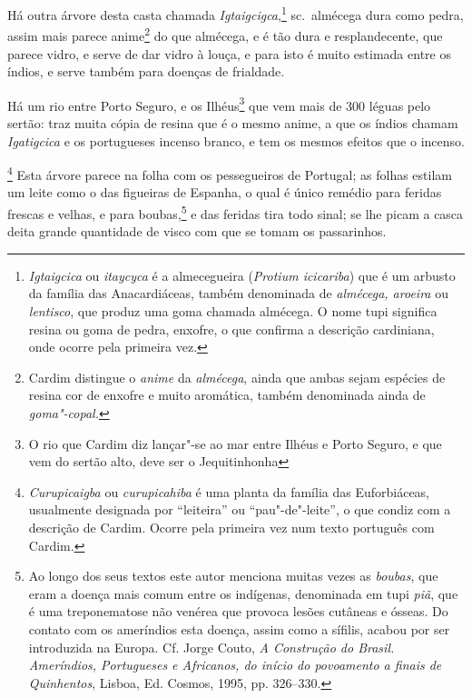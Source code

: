  Há outra árvore desta casta chamada \textit{Igtaigcigca},\footnote{ \textit{Igtaigcica} 
ou \textit{itaycyca} é a almecegueira
(\textit{Protium icicariba}) que é um arbusto da família das
Anacardiáceas, também denominada de \textit{almécega, aroeira} ou
\textit{lentisco}, que produz uma goma chamada almécega. O nome tupi
significa resina ou goma de pedra, enxofre, o que confirma a descrição
cardiniana, onde ocorre pela primeira vez.} sc.~almécega dura como
pedra, assim mais parece anime\footnote{ Cardim distingue o
\textit{anime} da \textit{almécega}, ainda que ambas sejam espécies de
resina cor de enxofre e muito aromática, também denominada ainda de
\textit{goma"-copal.}} do que almécega, e é tão dura e resplandecente,
que parece vidro, e serve de dar vidro à louça, e para isto é muito
estimada entre os índios, e serve também para doenças de frialdade.

 Há um rio entre Porto Seguro, e os Ilhéus\footnote{ O rio que Cardim
diz lançar"-se ao mar entre Ilhéus e Porto Seguro, e que vem do sertão
alto, deve ser o Jequitinhonha} que vem mais de 300 léguas
pelo sertão: traz muita cópia de resina que é o mesmo anime, a que os
índios chamam \textit{Igatigcica} e os portugueses incenso branco, e
tem os mesmos efeitos que o incenso.

\footnote{ \textit{Curupicaigba} ou
\textit{curupicahiba} é uma planta da família das Euforbiáceas,
usualmente designada por ``leiteira'' ou ``pau"-de"-leite'', o que condiz
com a descrição de Cardim. Ocorre pela primeira vez num texto português
com Cardim.} Esta árvore parece na folha com os pessegueiros
de Portugal; as folhas estilam um leite como o das figueiras de
Espanha, o qual é único remédio para feridas frescas e velhas, e para
boubas,\footnote{ Ao longo dos seus textos este autor menciona muitas
vezes as \textit{boubas}, que eram a doença mais comum entre os
indígenas, denominada em tupi \textit{piã}, que é uma treponematose não
venérea que provoca lesões cutâneas e ósseas. Do contato com os
ameríndios esta doença, assim como a sífilis, acabou por ser introduzida na
Europa. Cf. Jorge Couto, \textit{A Construção do Brasil. Ameríndios,
Portugueses e Africanos, do início do povoamento a finais de
Quinhentos}, Lisboa, Ed. Cosmos, 1995, pp. 326--330.} e das feridas
tira todo sinal; se lhe picam a casca deita grande quantidade de visco
com que se tomam os passarinhos.

